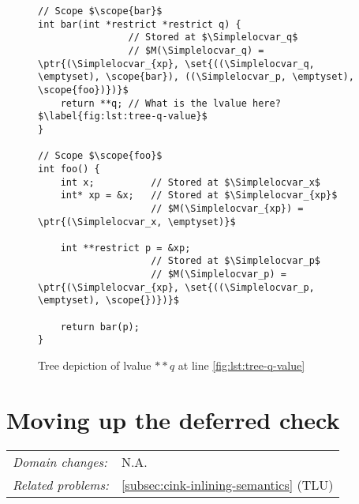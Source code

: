 \begin{figure}[htp]
\centering
\begin{minipage}{.5\textwidth}
\centering  
\begin{verbatim}
// Scope $\scope{bar}$
int bar(int *restrict *restrict q) {
                // Stored at $\Simplelocvar_q$
                // $M(\Simplelocvar_q) = \ptr{(\Simplelocvar_{xp}, \set{((\Simplelocvar_q, \emptyset), \scope{bar}), ((\Simplelocvar_p, \emptyset), \scope{foo})})}$
    return **q; // What is the lvalue here?$\label{fig:lst:tree-q-value}$
}

// Scope $\scope{foo}$
int foo() {
    int x;          // Stored at $\Simplelocvar_x$
    int* xp = &x;   // Stored at $\Simplelocvar_{xp}$
                    // $M(\Simplelocvar_{xp}) = \ptr{(\Simplelocvar_x, \emptyset)}$

    int **restrict p = &xp;
                    // Stored at $\Simplelocvar_p$
                    // $M(\Simplelocvar_p) = \ptr{(\Simplelocvar_{xp}, \set{((\Simplelocvar_p, \emptyset), \scope{})})}$

    return bar(p);
}
\end{verbatim}
\end{minipage}%
\begin{minipage}{.5\textwidth}
\centering
{}
\end{minipage}
\caption{Tree depiction of lvalue $\mathbin{**}q$ at line \ref{fig:lst:tree-q-value}}
\label{fig:tree}
\end{figure}


\newpage

\section{Moving up the deferred check}\label{sec:moving-up-the-deferred-check}
\vspace*{-\baselineskip}
\begin{table}[h]
\begin{tabular}{ll}
\textit{Domain changes:}   &  N.A. \\
\textit{Related problems:} & \ref{subsec:cink-inlining-semantics} (TLU)  \\
\end{tabular}
\end{table}

